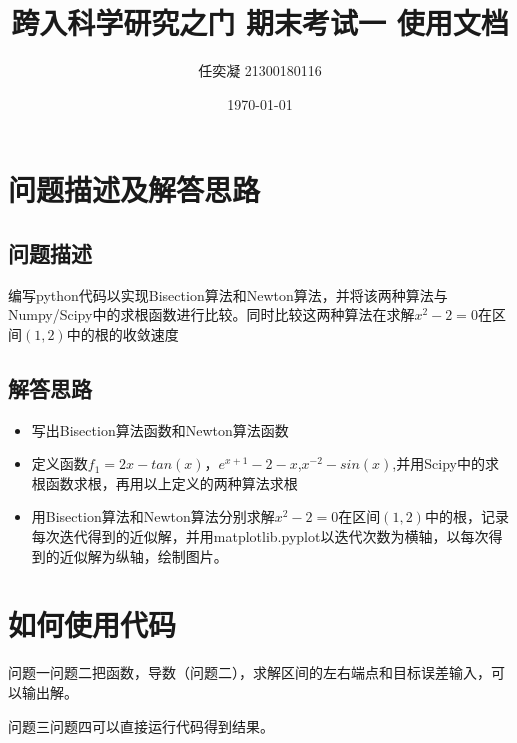 \documentclass[UTF8]{ctexart}
\author{任奕凝 21300180116}
\title{跨入科学研究之门 期末考试一 使用文档 }
\date{\today}
\begin{document}
	\maketitle
	
\section{问题描述及解答思路}
	\subsection{问题描述}
	编写python代码以实现Bisection算法和Newton算法，并将该两种算法与Numpy/Scipy中的求根函数进行比较。同时比较这两种算法在求解$x^2-2=0$在区间$(1,2)$中的根的收敛速度
	\subsection{解答思路}
	\begin{itemize}
		\item
		写出Bisection算法函数和Newton算法函数
		\item
		定义函数$f_{1}=2x-tan(x)$，$e^{x+1}-2-x$,$x^{-2}-sin(x)$,并用Scipy中的求根函数求根，再用以上定义的两种算法求根
		\item 
		用Bisection算法和Newton算法分别求解$x^2-2=0$在区间$(1,2)$中的根，记录每次迭代得到的近似解，并用matplotlib.pyplot以迭代次数为横轴，以每次得到的近似解为纵轴，绘制图片。
	\end{itemize}
	
\section{如何使用代码}
	问题一问题二把函数，导数（问题二），求解区间的左右端点和目标误差输入，可以输出解。
	
	问题三问题四可以直接运行代码得到结果。
\end{document}
